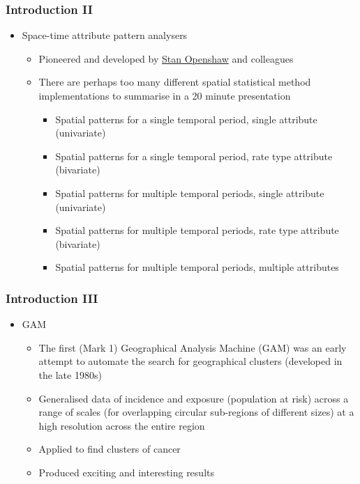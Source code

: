 \documentclass{beamer}
\begin{document}
\begin{frame}[t]
\frametitle{Introduction II}
\begin{itemize}
  \item Space-time attribute pattern analysers
  \begin{itemize}
    \item Pioneered and developed by \href{http://www.ccg.leeds.ac.uk/people/s.openshaw/}{Stan Openshaw} and colleagues
    \item There are perhaps too many different spatial statistical method implementations to summarise in a 20 minute presentation
    \begin{itemize}
      \item Spatial patterns for a single temporal period, single attribute (univariate)
      \item Spatial patterns for a single temporal period, rate type attribute (bivariate)
      \item Spatial patterns for multiple temporal periods, single attribute (univariate)
      \item Spatial patterns for multiple temporal periods, rate type attribute (bivariate)
      \item Spatial patterns for multiple temporal periods, multiple attributes
    \end{itemize}
  \end{itemize}
\end{itemize}
\end{frame}

\begin{frame}[t]
\frametitle{Introduction III}
\begin{itemize}
  \item GAM
  \begin{itemize}
    \item The first (Mark 1) Geographical Analysis Machine (GAM) was an early attempt to automate the search for geographical clusters (developed in the late 1980s)
    \item Generalised data of incidence and exposure (population at risk) across a range of scales (for overlapping circular sub-regions of different sizes) at a high resolution across the entire region
    \item Applied to find clusters of cancer
    \item Produced exciting and interesting results
  \end{itemize}
\end{itemize}
\end{frame}
\end{document}
